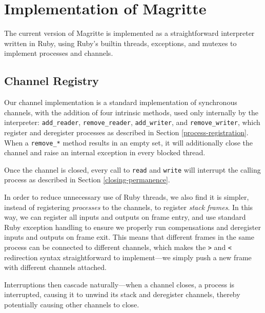 \ifsigpro{ \documentclass[english,PRO]{ipsj} }
\begin{document}
\section{Implementation of Magritte}\label{implementation}

\noindent
The current version of Magritte is implemented as a straightforward interpreter written in Ruby, using Ruby's builtin threads, exceptions, and mutexes to implement processes and channels.

\subsection{Channel Registry}\noindent
Our channel implementation is a standard implementation of synchronous channels, with the addition of four intrinsic methods, used only internally by the interpreter: \verb/add_reader/, \verb/remove_reader/, \verb/add_writer/, and \verb/remove_writer/, which register and deregister processes as described in Section \ref{process-registration}. When a \verb/remove_*/ method results in an empty set, it will additionally close the channel and raise an internal exception in every blocked thread.

Once the channel is closed, every call to \verb/read/ and \verb/write/ will interrupt the calling process as described in Section \ref{closing-permanence}.

In order to reduce unnecessary use of Ruby threads, we also find it is simpler, instead of registering \emph{processes} to the channels, to register \emph{stack frames}. In this way, we can register all inputs and outputs on frame entry, and use standard Ruby exception handling to ensure we properly run compensations and deregister inputs and outputs on frame exit. This means that different frames in the same process can be connected to different channels, which makes the \verb/>/ and \verb/</ redirection syntax straightforward to implement---we simply push a new frame with different channels attached.

Interruptions then cascade naturally---when a channel closes, a process is interrupted, causing it to unwind its stack and deregister channels, thereby potentially causing other channels to close.
\end{document}
